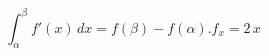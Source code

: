 \begin{equation}
    \int_\alpha^\beta f'(x) \, dx=f(\beta)-f(\alpha).
    f_x = 2 \, x
\end{equation}